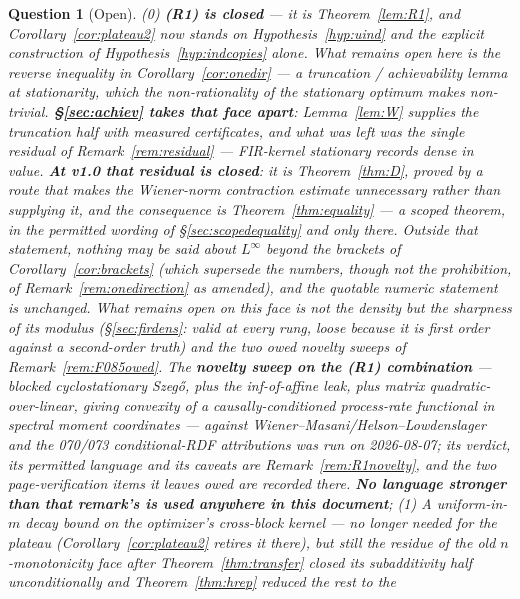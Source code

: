 \documentclass[11pt]{article}
\newtheorem{question}{Question}
\theoremstyle{definition}
\theoremstyle{remark}
\begin{document}
\begin{question}[Open]
\label{q:open}
(0) \textbf{(R1) is closed} --- it is Theorem~\ref{lem:R1}, and
Corollary~\ref{cor:plateau2} now stands on
Hypothesis~\ref{hyp:uind} and the explicit construction of
Hypothesis~\ref{hyp:indcopies} alone. What remains open here is the
\emph{reverse} inequality in Corollary~\ref{cor:onedir} --- a
truncation / achievability lemma at stationarity, which the
non-rationality of the stationary optimum makes non-trivial.
\textbf{\S\ref{sec:achiev} takes that face apart}: Lemma~\ref{lem:W}
supplies the truncation half with measured certificates, and what was
left was the single residual of Remark~\ref{rem:residual} --- FIR-kernel
stationary records dense in value.
\textbf{At v1.0 that residual is closed}: it is Theorem~\ref{thm:D}, proved
by a route that makes the Wiener-norm contraction estimate \emph{unnecessary}
rather than supplying it, and the consequence is
Theorem~\ref{thm:equality} --- \emph{a scoped theorem, in the permitted
wording of \S\ref{sec:scopedequality} and only there}. Outside that
statement, nothing may be said about $L^\infty$ beyond the brackets of
Corollary~\ref{cor:brackets} (which supersede the numbers, though not
the prohibition, of Remark~\ref{rem:onedirection} as amended), and the
quotable numeric statement is unchanged. What remains open on this
face is not the density but the \emph{sharpness} of its modulus
(\S\ref{sec:firdens}: valid at every rung, loose because it is first order
against a second-order truth) and the two \emph{owed} novelty sweeps of
Remark~\ref{rem:F085owed}. The
\textbf{novelty sweep on the (R1)
combination} --- blocked
cyclostationary Szeg\H o, plus the inf-of-affine leak, plus matrix
quadratic-over-linear, giving convexity of a causally-conditioned
process-rate functional in spectral moment coordinates --- against
Wiener--Masani/Helson--Lowdenslager \cite{bib:wm57,bib:wm58,bib:hl58}
and the 070/073 conditional-RDF attributions \cite{bib:gray73} was
\emph{run on 2026-08-07}; its verdict, its permitted language and its
caveats are Remark~\ref{rem:R1novelty}, and the \emph{two
page-verification items it leaves owed} are recorded there. \textbf{No
language stronger than that remark's is used anywhere in this
document};
(1) \emph{A uniform-in-$m$ decay bound on the optimizer's cross-block
kernel} --- \emph{no longer needed for the plateau}
(Corollary~\ref{cor:plateau2} retires it there), but still the residue
of the old $n$-monotonicity face after
Theorem~\ref{thm:transfer} closed its subadditivity half
unconditionally and Theorem~\ref{thm:hrep} reduced the rest to the

\end{question}
\end{document}
